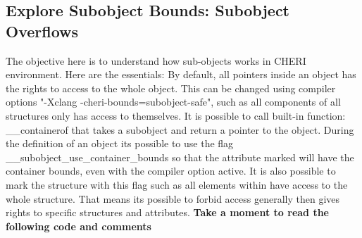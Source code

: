 \documentclass[a4paper, 11pt]{article}
\newcommand{\cmark}{\ding{51}}
\begin{document}
 

\subsection{Explore Subobject Bounds: Subobject Overflows}
	The objective here is to understand how sub-objects works in CHERI environment.
	Here are the essentials:
	By default, all pointers inside an object has the rights to access to the whole object.
	This can be changed using compiler options "-Xclang -cheri-bounds=subobject-safe", such as all components of all structures only has access to themselves.
	It is possible to call built-in function: \_\_containerof that takes a subobject and return a pointer to the object.
	During the definition of an object its possible to use the flag \_\_subobject\_use\_container\_bounds so that the attribute marked will have the container bounds, even with the compiler option active.
	It is also possible to mark the structure with this flag such as all elements within have access to the whole structure.
	That means its possible to forbid access generally then gives rights to specific structures and attributes.
	\textbf{Take a moment to read the following code and comments}
	
	
	\begin{center}
	\end{center}
\end{document}
